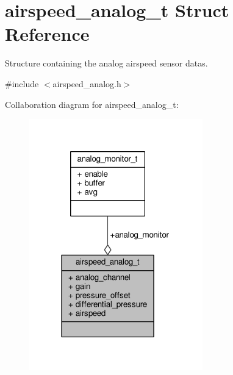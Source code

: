 \hypertarget{structairspeed__analog__t}{\section{airspeed\+\_\+analog\+\_\+t Struct Reference}
\label{structairspeed__analog__t}
}


Structure containing the analog airspeed sensor datas.  




{\ttfamily \#include $<$airspeed\+\_\+analog.\+h$>$}



Collaboration diagram for airspeed\+\_\+analog\+\_\+t\+:
\nopagebreak
\begin{figure}[H]
\begin{center}
\leavevmode
\includegraphics[width=213pt]{structairspeed__analog__t__coll__graph}
\end{center}
\end{figure}
